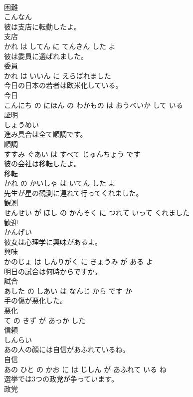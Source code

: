 \documentclass[8pt]{extreport}
\begin{document}
\begin{CJK}{UTF8}{min}
\\	困難	
\\	こんなん		
\\	彼は支店に転勤したよ。	
\\	支店 
\\	かれ は してん に てんきん した よ		
\\	彼は委員に選ばれました。	
\\	委員 
\\	かれ は いいん に えらばれました		
\\	今日の日本の若者は欧米化している。	
\\	今日 
\\	こんにち の にほん の わかもの は おうべいか して いる		
\\	証明	
\\	しょうめい		
\\	進み具合は全て順調です。	
\\	順調 
\\	すすみ ぐあい は すべて じゅんちょう です		
\\	彼の会社は移転したよ。	
\\	移転 
\\	かれ の かいしゃ は いてん した よ		
\\	先生が星の観測に連れて行ってくれました。	
\\	観測 
\\	せんせい が ほし の かんそく に つれて いって くれました		
\\	歓迎	
\\	かんげい		
\\	彼女は心理学に興味があるよ。	
\\	興味 
\\	かのじょ は しんりがく に きょうみ が ある よ		
\\	明日の試合は何時からですか。	
\\	試合 
\\	あした の しあい は なんじ から です か		
\\	手の傷が悪化した。	
\\	悪化 
\\	て の きず が あっか した		
\\	信頼	
\\	しんらい		
\\	あの人の顔には自信があふれているね。	
\\	自信 
\\	あの ひと の かお に は じしん が あふれて いる ね		
\\	選挙では3つの政党が争っています。	
\\	政党 

\end{CJK}
\end{document}
